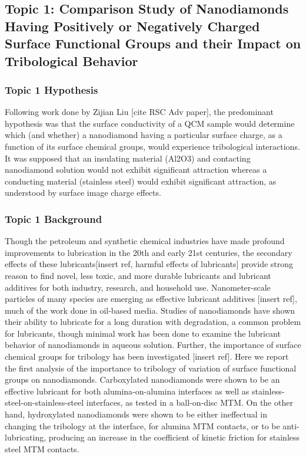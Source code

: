 \subsection{Topic 1: Comparison Study of Nanodiamonds Having Positively or Negatively Charged Surface Functional Groups and their Impact on Tribological Behavior}

\subsubsection{Topic 1 Hypothesis}

Following work done by Zijian Liu [cite RSC Adv paper], the predominant hypothesis was that the surface conductivity of a QCM sample would determine which (and whether) a nanodiamond having a particular surface charge, as a function of its surface chemical groups, would experience tribological interactions. It was supposed that an insulating material (Al2O3) and contacting nanodiamond solution would not exhibit significant attraction whereas a conducting material (stainless steel) would exhibit significant attraction, as understood by surface image charge effects.


\subsubsection{Topic 1 Background}

Though the petroleum and synthetic chemical industries have made profound improvements to lubrication in the 20th and early 21st centuries, the secondary effects of these lubricants[insert ref, harmful effects of lubricants] provide strong reason to find novel, less toxic, and more durable lubricants and lubricant additives for both industry, research, and household use. Nanometer-scale particles of many species are emerging as effective lubricant additives [insert ref], much of the work done in oil-based media. Studies of nanodiamonds have shown their ability to lubricate for a long duration with degradation, a common problem for lubricants, though minimal work has been done to examine the lubricant behavior of nanodiamonds in aqueous solution. Further, the importance of surface chemical groups for tribology has been investigated [insert ref]. Here we report the first analysis of the importance to tribology of variation of surface functional groups on nanodiamonds. Carboxylated nanodiamonds were shown to be an effective lubricant for both alumina-on-alumina interfaces as well as stainless-steel-on-stainless-steel interfaces, as tested in a ball-on-disc MTM. On the other hand, hydroxylated nanodiamonds were shown to be either ineffectual in changing the tribology at the interface, for alumina MTM contacts, or to be anti-lubricating, producing an increase in the coefficient of kinetic friction for stainless steel MTM contacts.


